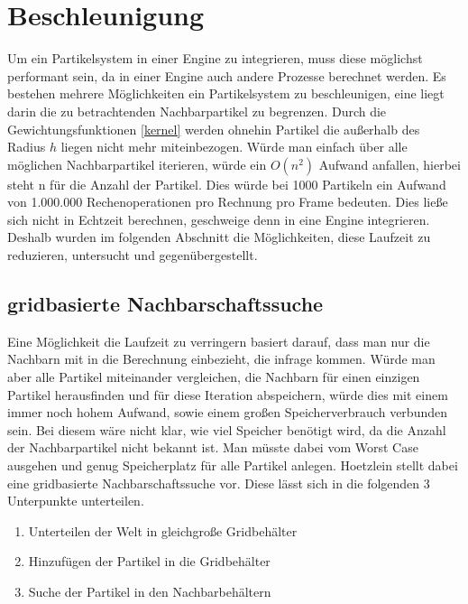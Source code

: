\documentclass[intern,palatino]{cgBA}
\begin{document}
\section{Beschleunigung}\label{besch}

Um ein Partikelsystem in einer Engine zu integrieren, muss diese möglichst performant sein, da in einer Engine auch andere Prozesse berechnet werden. Es bestehen mehrere Möglichkeiten ein Partikelsystem zu beschleunigen, eine liegt darin die zu betrachtenden Nachbarpartikel zu begrenzen. Durch die Gewichtungsfunktionen \ref{kernel} werden ohnehin Partikel die außerhalb des Radius $h$ liegen nicht mehr miteinbezogen. Würde man einfach über alle möglichen Nachbarpartikel iterieren, würde ein $O(n^2)$ Aufwand anfallen, hierbei steht n für die Anzahl der Partikel. Dies würde bei 1000 Partikeln ein Aufwand von 1.000.000 Rechenoperationen pro Rechnung pro Frame bedeuten. Dies ließe sich nicht in Echtzeit berechnen, geschweige denn in eine Engine integrieren. Deshalb wurden im folgenden Abschnitt die Möglichkeiten, diese Laufzeit zu reduzieren, untersucht und gegenübergestellt.  


\subsection{gridbasierte Nachbarschaftssuche}\label{nachbar}

Eine Möglichkeit die Laufzeit zu verringern basiert darauf, dass man nur die Nachbarn mit in die Berechnung einbezieht, die infrage kommen. Würde man aber alle Partikel miteinander vergleichen, die Nachbarn für einen einzigen Partikel herausfinden und für diese Iteration abspeichern, würde dies mit einem immer noch hohem Aufwand, sowie einem großen Speicherverbrauch verbunden sein. Bei diesem wäre nicht klar, wie viel Speicher benötigt wird, da die Anzahl der Nachbarpartikel nicht bekannt ist. Man müsste dabei vom Worst Case ausgehen und genug Speicherplatz für alle Partikel anlegen.
\newline
Hoetzlein \cite{nvidia} stellt dabei eine gridbasierte Nachbarschaftssuche vor. Diese lässt sich in die folgenden 3 Unterpunkte unterteilen.

\begin{enumerate}
	\item Unterteilen der Welt in gleichgroße Gridbehälter
	\item Hinzufügen der Partikel in die Gridbehälter
	\item Suche der Partikel in den Nachbarbehältern 
\end{enumerate}
\end{document}
